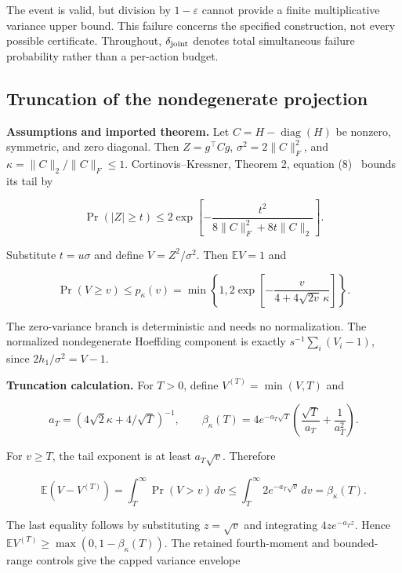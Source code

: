 The event is valid, but division by $1-\varepsilon$ cannot provide a finite multiplicative variance upper bound. This failure concerns the specified construction, not every possible certificate. Throughout, $\delta_{\rm joint}$ denotes total simultaneous failure probability rather than a per-action budget.

\subsection{Truncation of the nondegenerate projection}
\textbf{Assumptions and imported theorem.} Let $C=H-\operatorname{diag}(H)$ be nonzero, symmetric, and zero diagonal. Then $Z=g^\top Cg$, $\sigma^2=2\|C\|_F^2$, and $\kappa=\|C\|_2/\|C\|_F\le1$. Cortinovis--Kressner, Theorem 2, equation (8)~\cite{cortinovis2022} bounds its tail by


\begin{equation}
\Pr(|Z|\ge t)\le2\exp\!\left[-\frac{t^2}{8\|C\|_F^2+8t\|C\|_2}\right].
\end{equation}


Substitute $t=u\sigma$ and define $V=Z^2/\sigma^2$. Then $\mathbb EV=1$ and


\begin{equation}
\Pr(V\ge v)\le p_\kappa(v)
=\min\left\{1,2\exp\!\left[-\frac{v}{4+4\sqrt{2v}\,\kappa}\right]\right\}.
\end{equation}


The zero-variance branch is deterministic and needs no normalization. The normalized nondegenerate Hoeffding component is exactly $s^{-1}\sum_i(V_i-1)$, since $2h_1/\sigma^2=V-1$.


\textbf{Truncation calculation.} For $T>0$, define $V^{(T)}=\min(V,T)$ and


\begin{equation}
a_T=(4\sqrt2\kappa+4/\sqrt T)^{-1},\qquad
\beta_\kappa(T)=4e^{-a_T\sqrt T}
\left(\frac{\sqrt T}{a_T}+\frac1{a_T^2}\right).
\end{equation}


For $v\ge T$, the tail exponent is at least $a_T\sqrt v$. Therefore


\begin{equation}
\mathbb E(V-V^{(T)})=\int_T^\infty\Pr(V>v)\,dv
\le\int_T^\infty2e^{-a_T\sqrt v}\,dv=\beta_\kappa(T).
\end{equation}


The last equality follows by substituting $z=\sqrt v$ and integrating $4ze^{-a_Tz}$. Hence $\mathbb EV^{(T)}\ge\max(0,1-\beta_\kappa(T))$. The retained fourth-moment and bounded-range controls give the capped variance envelope


